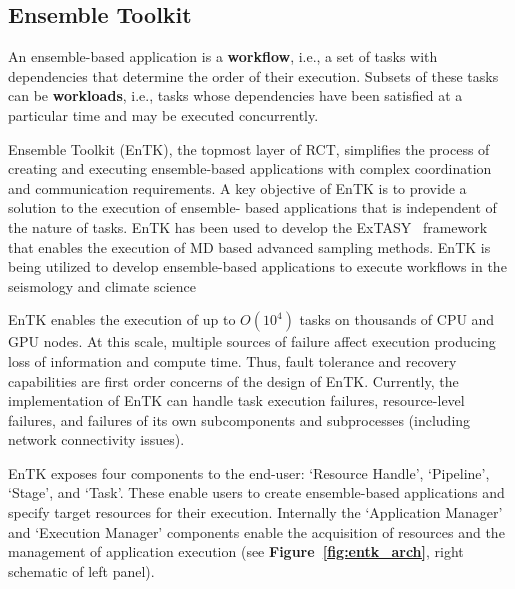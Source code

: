 \subsection{Ensemble Toolkit}

An ensemble-based application is a {\bf workflow}, i.e., a set of tasks with
dependencies that determine the order of their execution. Subsets of these
tasks can be {\bf workloads}, i.e., tasks whose dependencies have been
satisfied at a particular time and may be executed concurrently.

Ensemble Toolkit (EnTK), the topmost layer of RCT, simplifies the process of
creating and executing ensemble-based applications with complex coordination
and communication requirements.   A key objective of EnTK is to provide a
solution to the execution of ensemble- based applications that is independent
of the nature of tasks. EnTK  has been used to develop the
ExTASY~\cite{extasy-2016} framework that enables the execution of MD based
advanced sampling methods.  EnTK is being utilized to develop ensemble-based
applications to execute workflows in the seismology and climate science

EnTK enables the execution of up to $O(10^4)$ tasks on thousands of CPU and
GPU nodes. At this scale, multiple sources of failure affect execution
producing loss of information and compute time. Thus, fault tolerance and
recovery capabilities are first order concerns of the design of EnTK.
Currently, the implementation of EnTK can handle task execution failures,
resource-level failures, and failures of its own subcomponents and
subprocesses (including network connectivity issues).

EnTK exposes four components to the end-user: `Resource Handle', `Pipeline',
`Stage', and `Task'. These enable users to create ensemble-based applications
and specify target resources for their execution. Internally the `Application
Manager' and `Execution Manager' components enable the acquisition of
resources and the management of application execution (see
\textbf{Figure~\ref{fig:entk_arch}}, right schematic of left panel).

